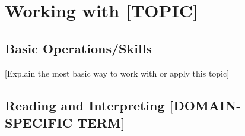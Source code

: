 \documentclass[12pt,letterpaper]{article}
\begin{document}
\section{Working with [TOPIC]}

\subsection{Basic Operations/Skills}

[Explain the most basic way to work with or apply this topic]

\begin{example}
\end{example}

\begin{solution}
\end{solution}

\begin{analogy}
\end{analogy}


\subsection{Reading and Interpreting [DOMAIN-SPECIFIC TERM]}
\end{document}

